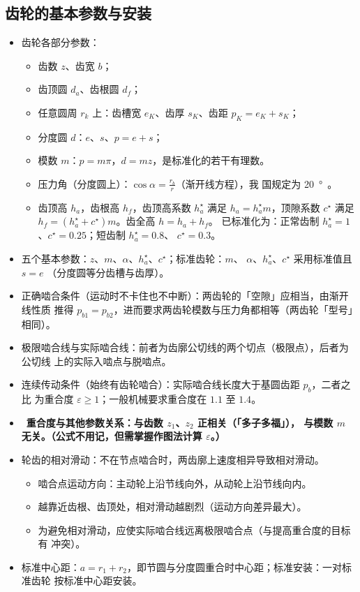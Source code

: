\documentclass[12pt,a4paper]{article}
\newcommand{\tightlist}{\setlength{\parskip}{0pt}\setlength{\itemsep}{0pt}}
\newcommand{\hint}[1]{\textsf{（#1）}}
\renewcommand{\emph}[1]{\faIcon[regular]{lightbulb}\ \textbf{#1}}
\begin{document}
\subsection{齿轮的基本参数与安装}
\begin{itemize}\tightlist
    \item 齿轮各部分参数：
    \begin{itemize}\tightlist
        \item 齿数 $z$、齿宽 $b$；
        \item 齿顶圆 $d_a$、齿根圆 $d_f$；
        \item 任意圆周 $r_k$ 上：齿槽宽 $e_K$、齿厚 $s_K$、齿距 $p_K=e_K+s_K$；
        \item 分度圆 $d$：$e$、$s$、$p=e+s$；
        \item 模数 $m$：$p=m\pi$，$d=mz$，是标准化的若干有理数。
        \item 压力角\hint{分度圆上}：$\cos\alpha=\frac{r_b}r$\hint{渐开线方程}，我
        国规定为 \SI{20}\degree。
        \item 齿顶高 $h_a$，齿根高 $h_f$，齿顶高系数 $h^\star_a$ 满足 $h_a=h^\star_a
        m$，顶隙系数 $c^\star$ 满足 $h_f=(h^\star_a+c^\star)m$。齿全高 $h=h_a+h_f$。
        已标准化为：正常齿制 $h^\star_a=1$、$c^\star=0.25$；短齿制 $h^\star_a=0.8$、
        $c^\star=0.3$。  
    \end{itemize}
    \item 五个基本参数：$z$、$m$、$\alpha$、$h^\star_a$、$c^\star$；标准齿轮：$m$、
    $\alpha$、$h^\star_a$、$c^\star$ 采用标准值且 $s=e$ \hint{分度圆等分齿槽与齿厚}。
    \item 正确啮合条件\hint{运动时不卡住也不中断}：两齿轮的「空隙」应相当，由渐开线性质
    推得 $p_{b1}=p_{b2}$，进而要求两齿轮模数与压力角都相等\hint{两齿轮「型号」相同}。
    \item 极限啮合线与实际啮合线：前者为齿廓公切线的两个切点\hint{极限点}，后者为公切线
    上的实际入啮点与脱啮点。
    \item 连续传动条件\hint{始终有齿轮啮合}：实际啮合线长度大于基圆齿距 $p_b$，二者之比
    为重合度 $\varepsilon\geq1$；一般机械要求重合度在 $1.1$ 至 $1.4$。
    \item \emph{重合度与其他参数关系：与齿数 $z_1$、$z_2$ 正相关\hint{「多子多福」}，
    与模数 $m$ 无关。\hint{公式不用记，但需掌握作图法计算 $\varepsilon$。}}
    \item 轮齿的相对滑动：不在节点啮合时，两齿廓上速度相异导致相对滑动。
    \begin{itemize}\tightlist
        \item 啮合点运动方向：主动轮上沿节线向外，从动轮上沿节线向内。
        \item 越靠近齿根、齿顶处，相对滑动越剧烈\hint{运动方向差异最大}。
        \item 为避免相对滑动，应使实际啮合线远离极限啮合点\hint{与提高重合度的目标有
        冲突}。
    \end{itemize}
    \item 标准中心距：$a=r_1+r_2$，即节圆与分度圆重合时中心距；标准安装：一对标准齿轮
    按标准中心距安装。
\end{itemize}
\end{document}
